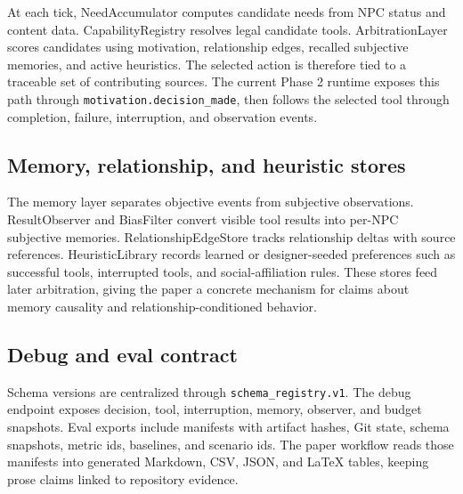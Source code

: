 At each tick, NeedAccumulator computes candidate needs from NPC status and content data. CapabilityRegistry resolves legal candidate tools. ArbitrationLayer scores candidates using motivation, relationship edges, recalled subjective memories, and active heuristics. The selected action is therefore tied to a traceable set of contributing sources. The current Phase 2 runtime exposes this path through \texttt{motivation.decision\_made}, then follows the selected tool through completion, failure, interruption, and observation events.

\subsection{Memory, relationship, and heuristic stores}

The memory layer separates objective events from subjective observations. ResultObserver and BiasFilter convert visible tool results into per-NPC subjective memories. RelationshipEdgeStore tracks relationship deltas with source references. HeuristicLibrary records learned or designer-seeded preferences such as successful tools, interrupted tools, and social-affiliation rules. These stores feed later arbitration, giving the paper a concrete mechanism for claims about memory causality and relationship-conditioned behavior.

\subsection{Debug and eval contract}

Schema versions are centralized through \texttt{schema\_registry.v1}. The debug endpoint exposes decision, tool, interruption, memory, observer, and budget snapshots. Eval exports include manifests with artifact hashes, Git state, schema snapshots, metric ids, baselines, and scenario ids. The paper workflow reads those manifests into generated Markdown, CSV, JSON, and LaTeX tables, keeping prose claims linked to repository evidence.
